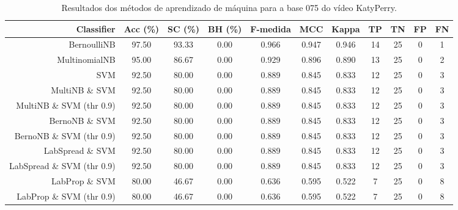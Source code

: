 \begin{table}[!htb]
\centering
\caption{Resultados dos métodos de aprendizado de máquina para a base 075 do vídeo KatyPerry.}
\label{tab:KatyPerry-075}
\begin{tabular}{r|c|c|c|c|c|c|c|c|c|c}
\hline\hline
Classifier & Acc (\%) & SC (\%) & BH (\%) & F-medida & MCC & Kappa & TP & TN & FP & FN \\ \hline
BernoulliNB & 97.50 & 93.33 & 0.00 & 0.966 & 0.947 & 0.946 & 14 & 25 & 0 & 1 \\ 
MultinomialNB & 95.00 & 86.67 & 0.00 & 0.929 & 0.896 & 0.890 & 13 & 25 & 0 & 2 \\ 
SVM & 92.50 & 80.00 & 0.00 & 0.889 & 0.845 & 0.833 & 12 & 25 & 0 & 3 \\ 
MultiNB \& SVM & 92.50 & 80.00 & 0.00 & 0.889 & 0.845 & 0.833 & 12 & 25 & 0 & 3 \\ 
MultiNB \& SVM (thr 0.9) & 92.50 & 80.00 & 0.00 & 0.889 & 0.845 & 0.833 & 12 & 25 & 0 & 3 \\ 
BernoNB \& SVM & 92.50 & 80.00 & 0.00 & 0.889 & 0.845 & 0.833 & 12 & 25 & 0 & 3 \\ 
BernoNB \& SVM (thr 0.9) & 92.50 & 80.00 & 0.00 & 0.889 & 0.845 & 0.833 & 12 & 25 & 0 & 3 \\ 
LabSpread \& SVM & 92.50 & 80.00 & 0.00 & 0.889 & 0.845 & 0.833 & 12 & 25 & 0 & 3 \\ 
LabSpread \& SVM (thr 0.9) & 92.50 & 80.00 & 0.00 & 0.889 & 0.845 & 0.833 & 12 & 25 & 0 & 3 \\ 
LabProp \& SVM & 80.00 & 46.67 & 0.00 & 0.636 & 0.595 & 0.522 & 7 & 25 & 0 & 8 \\ 
LabProp \& SVM (thr 0.9) & 80.00 & 46.67 & 0.00 & 0.636 & 0.595 & 0.522 & 7 & 25 & 0 & 8 \\ 
\hline\hline
\end{tabular}
\end{table}
